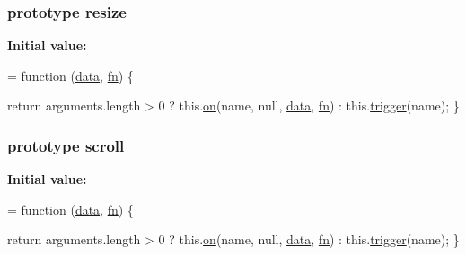 \subsubsection[{\texorpdfstring{resize}{resize}}]{ {\bf prototype} resize}\hypertarget{jquery-2_82_81-vsdoc_8js_a44dd45019a8a101b7494ad2d837d1bd6}{}\label{jquery-2_82_81-vsdoc_8js_a44dd45019a8a101b7494ad2d837d1bd6}
{\bfseries Initial value\+:}
\begin{DoxyCode}
= \textcolor{keyword}{function} (\hyperlink{jquery-2_82_81-vsdoc_8js_a609407b3456fdc3c5671a9fc4a226ff7}{data}, \hyperlink{jquery-2_82_81-vsdoc_8js_acef6bdaf6b9b20fdcca1ea86f0902c3b}{fn}) \{
        

        \textcolor{keywordflow}{return} arguments.length > 0 ?
            this.\hyperlink{jquery-2_82_81-vsdoc_8js_ae453b412b883f60220d73468ef6c6dbc}{on}(name, null, \hyperlink{jquery-2_82_81-vsdoc_8js_a609407b3456fdc3c5671a9fc4a226ff7}{data}, \hyperlink{jquery-2_82_81-vsdoc_8js_acef6bdaf6b9b20fdcca1ea86f0902c3b}{fn}) :
            this.\hyperlink{jquery-2_82_81-vsdoc_8js_a2388c4114d5e3e4eab020f973641519c}{trigger}(name);
    \}
\end{DoxyCode}
\subsubsection[{\texorpdfstring{scroll}{scroll}}]{ {\bf prototype} scroll}\hypertarget{jquery-2_82_81-vsdoc_8js_a73d4238d7a29e98ea195669790b68a9d}{}\label{jquery-2_82_81-vsdoc_8js_a73d4238d7a29e98ea195669790b68a9d}
{\bfseries Initial value\+:}
\begin{DoxyCode}
= \textcolor{keyword}{function} (\hyperlink{jquery-2_82_81-vsdoc_8js_a609407b3456fdc3c5671a9fc4a226ff7}{data}, \hyperlink{jquery-2_82_81-vsdoc_8js_acef6bdaf6b9b20fdcca1ea86f0902c3b}{fn}) \{
        

        \textcolor{keywordflow}{return} arguments.length > 0 ?
            this.\hyperlink{jquery-2_82_81-vsdoc_8js_ae453b412b883f60220d73468ef6c6dbc}{on}(name, null, \hyperlink{jquery-2_82_81-vsdoc_8js_a609407b3456fdc3c5671a9fc4a226ff7}{data}, \hyperlink{jquery-2_82_81-vsdoc_8js_acef6bdaf6b9b20fdcca1ea86f0902c3b}{fn}) :
            this.\hyperlink{jquery-2_82_81-vsdoc_8js_a2388c4114d5e3e4eab020f973641519c}{trigger}(name);
    \}
\end{DoxyCode}
